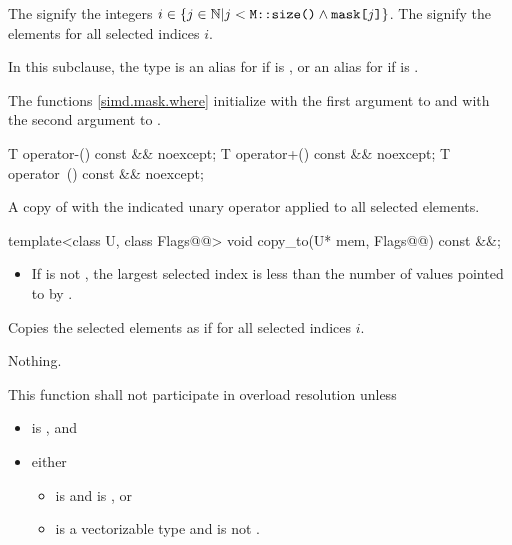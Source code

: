\pnum
The  signify the integers $i \in \{j \in \mathbb{N} | j < \texttt{M::size()} \wedge \texttt{mask[}j\texttt{]}\}$. The  signify the elements  for all selected indices $i$.

\pnum
In this subclause, the type  is an alias for  if  is , or an alias for  if  is .

\pnum
\begin{note}
  The  functions \ref{simd.mask.where} initialize  with the first argument to  and  with the second argument to .
\end{note}

\begin{itemdecl}
T operator-() const && noexcept;
T operator+() const && noexcept;
T operator~() const && noexcept;
\end{itemdecl}

\begin{itemdescr}
  \pnum\returns
  A copy of  with the indicated unary operator applied to all selected elements.
\end{itemdescr}

\begin{itemdecl}
template<class U, class Flags@@> void copy_to(U* mem, Flags@\wgAdd{ = \{\}}@) const &&;
\end{itemdecl}

\begin{itemdescr}
  \pnum\requires
  \begin{itemize}
    \item If  is not , the largest selected index is less than the number of values pointed to by .
  \end{itemize}

  \pnum\effects
  Copies the selected elements as if  for all selected indices $i$.

  \pnum\throws Nothing.

  \pnum\remarks
  This function shall not participate in overload resolution unless
  \begin{itemize}
    \item {} is , and
    \item either
      \begin{itemize}
        \item {} is  and  is , or
        \item {} is a vectorizable type and  is not .
      \end{itemize}
  \end{itemize}
\end{itemdescr}

